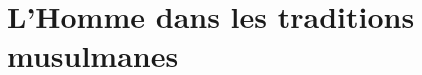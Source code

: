 \documentclass[oneside,10pt]{book}
\begin{document}
 







\setcounter{page}{1}
 



%
%

% 
%
%
%

%
%

% 
  \part{L'Homme dans les traditions musulmanes}
 
 
 


%

%
\end{document}
